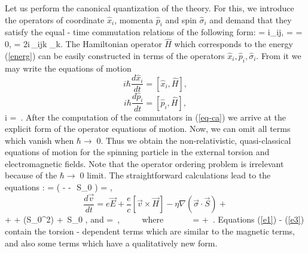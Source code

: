 Let us perform the canonical quantization of the theory. For this, we
introduce the operators of coordinate $\hat{x}_i$, momenta $\hat{p}_i$ and
spin $\hat{\sigma}_i$ and demand that they satisfy the equal - time 
commutation relations of the following form:
\beq
{} 
= i\hbar \;\delta_{ij}\;,\;\;\;\;\;\;\;\;\;\;
 =
 = 0\;, \;\;\;\;\;\;\;\;\;
 =
2i\,\varepsilon_{ijk}\; \hat{\sigma}_k\;.
\label{kom}
\eeq
The Hamiltonian operator $\hat{H}$ which corresponds to the energy 
(\ref{energ}) can be easily constructed in terms of the operators 
$\hat{x}_i, \hat{p}_i, \hat{\sigma}_i$. From it we may write the 
equations of motion
$$
i\hbar \frac{d\hat{x}_i}{dt} = \left[\hat{x}_i, \hat{H} \right],
$$
$$
i\hbar \frac{d\hat{p}_i}{dt} = \left[\hat{p}_i, \hat{H} \right],
$$
\beq
i\hbar {} = \,.
\label{eq-ca}
\eeq
After the computation of the commutators in (\ref{eq-ca}) we arrive at 
the explicit form of the operator equations of motion. Now, we can omit
all terms which vanish when $\hbar \rightarrow \; 0$. Thus we obtain
the non-relativistic, quasi-classical equations of motion for the 
spinning particle in
the external torsion and electromagnetic fields. Note that the operator
ordering problem is irrelevant because of the 
$\hbar \rightarrow \; 0$ limit. The straightforward calculations
lead to the equations \cite{babush}:
\beq
{} =  \left(  - 
- \,\vec{\sigma}\,S_0 \right) = ,
\label{e1}
\eeq
\vskip 0.5mm
$$
\frac{d\vec{v}}{dt} = e\vec{E} + \frac{e}{c}\left[ \vec{v}\times\vec{H} \right]
- \eta\nabla\left(\vec{\sigma}\cdot \vec{S} \right) +
$$
\beq
+    
+ \; \nabla (S_0^2)
+ \,S_0\,\,,
\label{e2}
\eeq
and
\beq
{} = 
\,,\,\,\,\,\,\,\,\,\,\,\,\,\,\,\,\,{\rm where}
\,\,\,\,\,\,\,\,\,\,\,\,\,\,\,\,\,
 = \frac{2\eta}{\hbar}
+ \,.
\label{e3}
\eeq
Equations (\ref{e1}) - (\ref{e3}) contain the torsion - dependent 
terms which are similar to the magnetic terms, and also some terms 
which have a qualitatively new form. 


